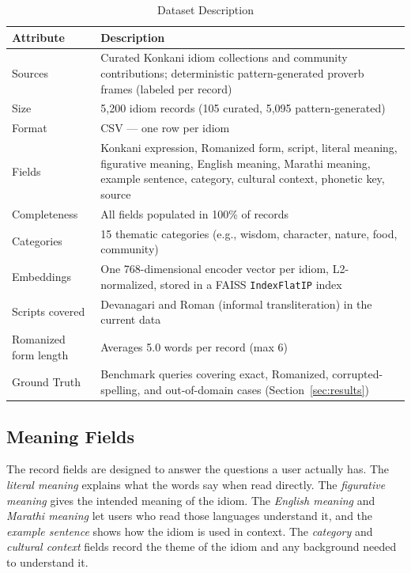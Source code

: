 \documentclass[12pt,a4paper]{article}
\begin{document}
\begin{table}[H]
\centering
\caption{Dataset Description}
\label{tab:dataset}
\renewcommand{\arraystretch}{1.3}
\begin{tabularx}{\linewidth}{|l|X|}
\hline
\textbf{Attribute} & \textbf{Description} \\
\hline
Sources & Curated Konkani idiom collections and community contributions; deterministic pattern-generated proverb frames (labeled per record) \\
\hline
Size & 5,200 idiom records (105 curated, 5,095 pattern-generated) \\
\hline
Format & CSV --- one row per idiom \\
\hline
Fields & Konkani expression, Romanized form, script, literal meaning, figurative meaning, English meaning, Marathi meaning, example sentence, category, cultural context, phonetic key, source \\
\hline
Completeness & All fields populated in 100\% of records \\
\hline
Categories & 15 thematic categories (e.g., wisdom, character, nature, food, community) \\
\hline
Embeddings & One 768-dimensional encoder vector per idiom, L2-normalized, stored in a FAISS \texttt{IndexFlatIP} index \\
\hline
Scripts covered & Devanagari and Roman (informal transliteration) in the current data \\
\hline
Romanized form length & Averages 5.0 words per record (max 6) \\
\hline
Ground Truth & Benchmark queries covering exact, Romanized, corrupted-spelling, and out-of-domain cases (Section~\ref{sec:results}) \\
\hline
\end{tabularx}
\end{table}

\subsection{Meaning Fields}
The record fields are designed to answer the questions a user actually has. The \emph{literal meaning} explains what the words say when read directly. The \emph{figurative meaning} gives the intended meaning of the idiom. The \emph{English meaning} and \emph{Marathi meaning} let users who read those languages understand it, and the \emph{example sentence} shows how the idiom is used in context. The \emph{category} and \emph{cultural context} fields record the theme of the idiom and any background needed to understand it.
\end{document}

